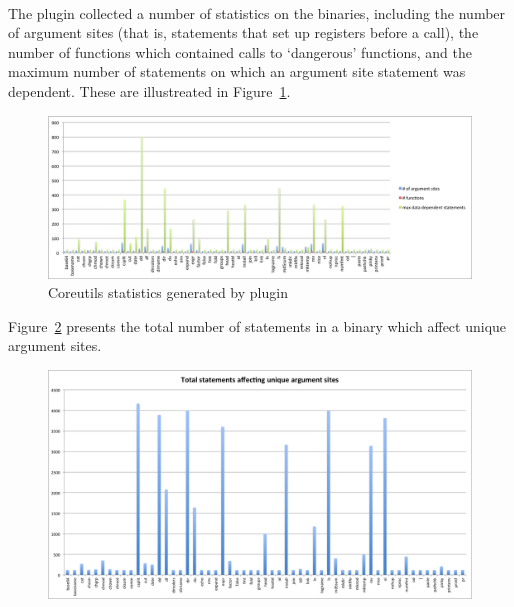 \documentclass[letterpaper,11pt]{article}
\begin{document}
\paragraph{}
The plugin collected a number of statistics on the binaries, including
the number of argument sites (that is, statements that set up registers
before a call), the number of functions which contained calls to `dangerous'
functions, and the maximum number of statements on which an argument
site statement was dependent. These are illustreated in Figure~\ref{fig:corestats}.

\begin{figure}[ht!]
\centering
\includegraphics[scale=0.55, trim=0mm 0mm 0mm 0mm, clip]{img/coreutils2.pdf}
\caption{Coreutils statistics generated by plugin}
\label{fig:corestats}
\end{figure}

Figure~\ref{fig:coretotal} presents the total number of statements in a binary
which affect unique argument sites.

\begin{figure}[ht!]
\centering
\includegraphics[scale=0.45, trim=0mm 0mm 0mm 0mm, clip]{img/coreutilstotal.pdf}
\label{fig:coretotal}
\end{figure}
\end{document}
